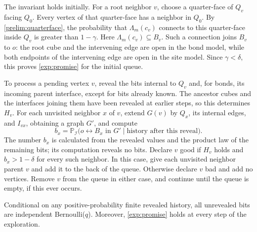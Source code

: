 The invariant holds initially. For a root neighbor $v$, choose a
quarter-face of $Q_v$ facing $Q_0$. Every vertex of that quarter-face has
a neighbor in $Q_0$. By \eqref{prelim:quarterface}, the probability that
$\Lambda_m(c_v)$ connects to this quarter-face inside $Q_v$ is greater
than $1-\gamma$. Here $\Lambda_m(c_v)\subseteq B_v$. Such a connection
joins $B_v$ to $o$: the root cube and the intervening edge are open in
the bond model, while both endpoints of the intervening edge are open
in the site model. Since $\gamma<\delta$, this proves
\eqref{exp:promise} for the initial queue.

To process a pending vertex $v$, reveal the bits internal to $Q_v$ and, for
bonds, its incoming parent interface, except for bits already known.
The ancestor cubes and the interfaces joining them have been
revealed at earlier steps, so this determines $H_v$.
For each unvisited neighbor $x$ of $v$, extend $G(v)$ by $Q_x$,
its internal edges, and $I_{vx}$, obtaining a graph $G'$, and compute
\begin{equation}
 b_x=\mathbb P_{\mathcal I}
 \bigl(o\leftrightarrow B_x\text{ in }G'
       \mid\text{history after this reveal}\bigr).
 \label{exp:child-probability}
\end{equation}
The number $b_x$ is calculated from the revealed values and the
product law of the remaining bits; its computation reveals no bits.
Declare $v$ good if $H_v$ holds and $b_x>1-\delta$ for every such
neighbor. In this case, give each unvisited neighbor parent $v$
and add it to the back of the queue. Otherwise declare $v$ bad and
add no vertices. Remove $v$ from the queue in either case, and
continue until the queue is empty, if this ever occurs.

\begin{lemma}
\label{exp:freshness}
Conditional on any positive-probability finite revealed history, all
unrevealed bits are independent Bernoulli($q$). Moreover,
\eqref{exp:promise} holds at every step of the exploration.
\end{lemma}

